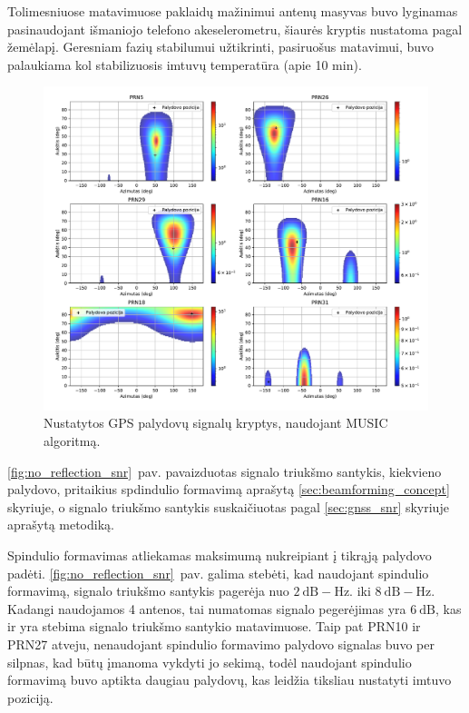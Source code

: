 \documentclass[main.tex]{subfiles}
\begin{document}
Tolimesniuose matavimuose paklaidų mažinimui antenų masyvas buvo lyginamas pa\-si\-nau\-do\-jant
išmaniojo telefono akeselerometru, šiaurės kryptis nustatoma pagal žemėlapį.
Geresniam fazių stabilumui užtikrinti, pasiruošus matavimui, buvo palaukiama
kol stabilizuosis imtuvų temperatūra (apie 10 min).

\begin{figure}[ht]
    \begin{centering}
    \includegraphics[scale=0.55]{drawings/no_reflection}
    \par\end{centering}
    \protect\caption{\label{fig:no_reflection}Nustatytos GPS palydovų signalų kryptys, naudojant MUSIC algoritmą.}
\end{figure}

\ref{fig:no_reflection_snr}~pav. pavaizduotas signalo triukšmo santykis, kiekvieno palydovo,
pritaikius spdindulio formavimą aprašytą \ref{sec:beamforming_concept} skyriuje, o
signalo triukšmo santykis suskaičiuotas pagal \ref{sec:gnss_snr} skyriuje aprašytą
metodiką.

Spindulio formavimas atliekamas maksimumą nukreipiant į tikrąją palydovo padėti.
\ref{fig:no_reflection_snr}~pav. galima stebėti, kad naudojant spindulio formavimą,
signalo triukšmo santykis pagerėja nuo $2\ \mathrm{dB-Hz}$. iki $8\ \mathrm{dB-Hz}$.
Kadangi naudojamos 4 antenos, tai numatomas signalo pegerėjimas yra $6\ \mathrm{dB}$,
kas ir yra stebima signalo triukšmo santykio matavimuose. Taip pat PRN10 ir PRN27 atveju,
nenaudojant spindulio formavimo palydovo signalas buvo per silpnas, kad būtų
įmanoma vykdyti jo sekimą, todėl naudojant spindulio formavimą buvo aptikta
daugiau palydovų, kas leidžia tiksliau nustatyti imtuvo poziciją.
\end{document}
